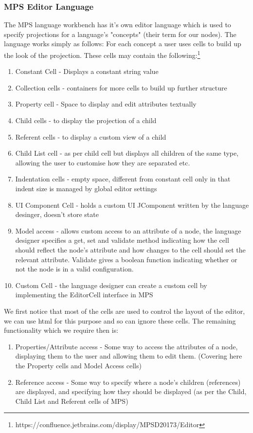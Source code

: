 \documentclass{article}
\begin{document}
\subsubsection{MPS Editor Language}
The MPS language workbench has it's own editor language which is used to specify projections for a language's "concepts" (their term for our nodes). The language works simply as follows: For each concept a user uses cells to build up the look of the projection. These cells may contain the following:\footnote{https://confluence.jetbrains.com/display/MPSD20173/Editor}
\begin{enumerate}
\item Constant Cell - Displays a constant string value
\item Collection cells - containers for more cells to build up further structure
\item Property cell - Space to display and edit attributes textually
\item Child cells - to display the projection of a child
\item Referent cells - to display a custom view of a child
\item Child List cell - as per child cell but displays all children of the same type, allowing the user to customise how they are separated etc.
\item Indentation cells - empty space, different from constant cell only in that indent size is managed by global editor settings
\item UI Component Cell - holds a custom UI JComponent written by the language desinger, doesn't store state
\item Model access - allows custom access to an attribute of a node, the language designer specifies a get, set and validate method indicating how the cell should reflect the node's attribute and how changes to the cell should set the relevant attribute. Validate gives a boolean function indicating whether or not the node is in a valid configuration.
\item Custom Cell - the language designer can create a custom cell by implementing the EditorCell interface in MPS
\end{enumerate}
%
We first notice that most of the cells are used to control the layout of the editor, we can use html for this purpose and so can ignore these cells. The remaining functionality which we require then is:
\begin{enumerate}
\item Properties/Attribute access - Some way to access the attributes of a node, displaying them to the user and allowing them to edit them.  (Covering here the Property cells and Model Access cells)
\item Reference access - Some way to specify where a node's children (references) are displayed, and specifying how they should be displayed (as per the Child, Child List and Referent cells of MPS)
\end{enumerate}
\end{document}
